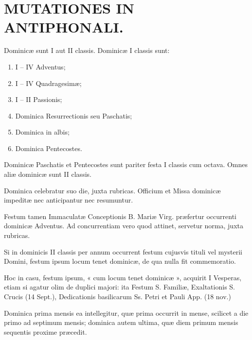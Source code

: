\documentclass[vesperale_romanum.tex]{subfiles}
\begin{document}
\chapter*{MUTATIONES IN ANTIPHONALI.}



Dominicæ sunt I aut II classis. Dominicæ I classis sunt:

\begin{enumerate}[nosep,label=\alph*.]
\item I – IV Adventus;
\item I – IV Quadragesimæ;
\item I – II Passionis;
\item  Dominica Resurrectionis seu Paschatis;
\item Dominica in albis;
\item Dominica Pentecostes. %
\end{enumerate}

Dominicæ Paschatis et Pentecostes sunt pariter festa I classis cum octava. Omnes aliæ dominicæ sunt II classis.

Dominica celebratur suo die, juxta rubricas. Officium et Missa dominicæ impeditæ nec anticipantur nec resumuntur.

Festum tamen Immaculatæ Conceptionis B. Mariæ Virg. præfertur occurrenti dominicæ Adventus.
Ad concurrentiam vero quod attinet, servetur norma, juxta rubricas.

Si in dominicis II classis per annum occurrent festum cujusvis tituli vel mysterii Domini, festum ipsum locum tenet dominicæ, de qua nulla fit commemoratio.

Hoc in casu, festum ipsum, « cum locum tenet dominicæ », acquirit I Vesperas, etiam si agatur olim de duplici majori: ita Festum S. Familiæ, Exaltationis S. Crucis (14 Sept.), Dedicationis basilicarum Ss. Petri et Pauli App. (18 nov.) %

Dominica prima mensis ea intellegitur, quæ prima occurrit in mense, scilicet a die primo ad septimum mensis; dominica autem ultima, quæ diem primum mensis sequentis proxime præcedit.
\end{document}
